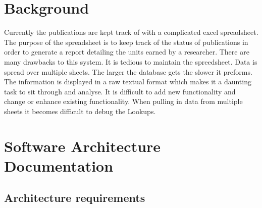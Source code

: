 \documentclass{article}
\begin{document}
	\section{Background}
	Currently the publications are kept track of with a complicated excel spreadsheet. The purpose of the spreadsheet is to keep track of the status of publications in order to generate a report detailing the units earned by a researcher. There are many drawbacks to this system. It is tedious to maintain the spreedsheet. Data is spread over multiple sheets. The larger the database gets the slower it preforms. The information is displayed in a raw textual format which makes it a daunting task to sit through and analyse. It is difficult to add new functionality and change or enhance existing functionality. When pulling in data from multiple sheets it becomes difficult to debug the Lookups.

	\section{Software Architecture Documentation}

		\subsection{Architecture requirements}
\end{document}

